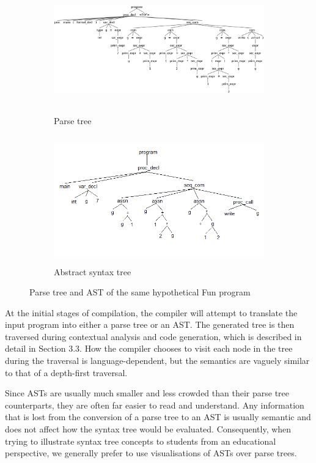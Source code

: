 \documentclass{l4proj}
\begin{document}
\begin{figure}[h]
	\begin{subfigure}[b]{0.5\textwidth}
		\includegraphics[height=5.5cm,width=\linewidth]{images/2-2a.png}
		\caption{Parse tree}
		\label{fig:ANTLR-parse-tree}
	\end{subfigure}
	\begin{subfigure}[b]{0.5\textwidth}
		\includegraphics[height=5.5cm,width=\linewidth]{images/2-2b.png}
		\caption{Abstract syntax tree}
		\label{fig:ANTLR-syntax-tree}
	\end{subfigure}
	\caption{Parse tree and AST of the same hypothetical Fun program}\label{fig:parse-abstract-tree}	
\end{figure}

At the initial stages of compilation, the compiler will attempt to translate the input program into either a parse tree or an AST. The generated tree is then traversed during contextual analysis and code generation, which is described in detail in Section 3.3. How the compiler chooses to visit each node in the tree during the traversal is language-dependent, but the semantics are vaguely similar to that of a depth-first traversal. 

Since ASTs are usually much smaller and less crowded than their parse tree counterparts, they are often far easier to read and understand. Any information that is lost from the conversion of a parse tree to an AST is usually semantic and does not affect how the syntax tree would be evaluated. Consequently, when trying to illustrate syntax tree concepts to students from an educational perspective, we generally prefer to use visualisations of ASTs over parse trees.
\end{document}
